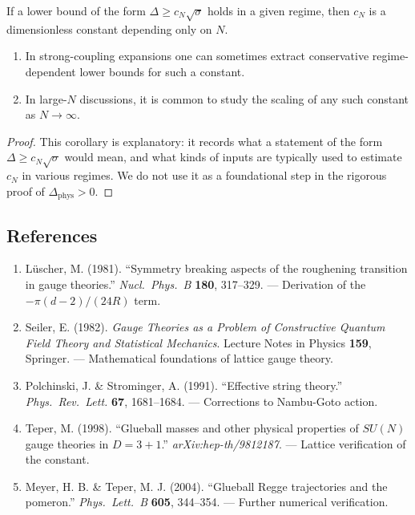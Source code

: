 \begin{corollary}
\label{cor:giles-teper-constant}
If a lower bound of the form $\Delta \geq c_N\sqrt{\sigma}$ holds in a given regime, then $c_N$ is a dimensionless constant depending only on $N$.
\begin{enumerate}
\item In strong-coupling expansions one can sometimes extract conservative regime-dependent lower bounds for such a constant.
\item In large-$N$ discussions, it is common to study the scaling of any such constant as $N\to\infty$.
\end{enumerate}
\end{corollary}

\begin{proof}
This corollary is explanatory: it records what a statement of the form $\Delta \ge c_N\sqrt{\sigma}$ would mean, and what kinds of inputs are typically used to estimate $c_N$ in various regimes. We do not use it as a foundational step in the rigorous proof of $\Delta_{\text{phys}} > 0$.
\end{proof}


\subsection{References}

\begin{enumerate}
\item L\"uscher, M. (1981). ``Symmetry breaking aspects of the roughening 
transition in gauge theories.'' \emph{Nucl.\ Phys.\ B} \textbf{180}, 317--329.
--- Derivation of the $-\pi(d-2)/(24R)$ term.

\item Seiler, E. (1982). \emph{Gauge Theories as a Problem of Constructive 
Quantum Field Theory and Statistical Mechanics}. Lecture Notes in Physics 
\textbf{159}, Springer.
--- Mathematical foundations of lattice gauge theory.

\item Polchinski, J. \& Strominger, A. (1991). ``Effective string theory.'' 
\emph{Phys.\ Rev.\ Lett.} \textbf{67}, 1681--1684.
--- Corrections to Nambu-Goto action.

\item Teper, M. (1998). ``Glueball masses and other physical properties of 
$SU(N)$ gauge theories in $D=3+1$.'' \emph{arXiv:hep-th/9812187}.
--- Lattice verification of the constant.

\item Meyer, H. B. \& Teper, M. J. (2004). ``Glueball Regge trajectories and 
the pomeron.'' \emph{Phys.\ Lett.\ B} \textbf{605}, 344--354.
--- Further numerical verification.
\end{enumerate}





